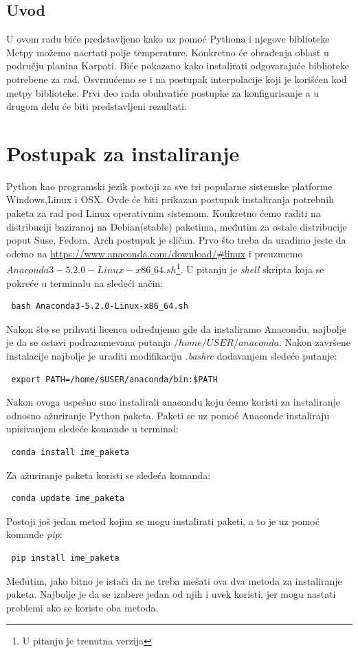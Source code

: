 \documentclass[12pt]{article}
\begin{document}
\newpage
\begin{center}
\section*{Uvod}
U ovom radu biće predstavljeno kako uz pomoć Pythona i njegove biblioteke Metpy možemo nacrtati polje temperature. Konkretno će obrađenja oblast u području planina Karpati. Biće pokazano kako instalirati odgovarajuće biblioteke potrebene za rad. Osvrnućemo se i na postupak interpolacije koji je korišćen kod metpy biblioteke. Prvi deo rada obuhvatiće postupke za konfigurisanje a u drugom delu će biti predstavljeni rezultati. 
\end{center}
\newpage
\section{Postupak za instaliranje}
Python kao programski jezik postoji za sve tri popularne sistemske platforme Windows,Linux i OSX. Ovde će biti prikazan postupak instaliranja potrebnih paketa za rad pod Linux operativnim sistemom. Konkretno ćemo raditi na distribuciji baziranoj na Debian(stable) paketima, međutim za ostale distribucije poput Suse, Fedora, Arch postupak je sličan.
Prvo što treba da uradimo jeste da odemo na \url{https://www.anaconda.com/download/#linux} i preuzmemo $Anaconda3-5.2.0-Linux-x86{\_64}.sh$\footnote{U pitanju je trenutna verzija}. U pitanju je \textsl{shell} skripta koja se pokreće u terminalu na sledeći način: 
\begin{lstlisting}
 bash Anaconda3-5.2.0-Linux-x86_64.sh
\end{lstlisting}
Nakon što se prihvati licenca određujemo gde da instaliramo Anacondu, najbolje je da se ostavi podrazumevana putanja $/home/USER/anaconda$. Nakon završene instalacije najbolje je uraditi modifikaciju \textsl{.bashrc} dodavanjem sledeće putanje:
\begin{lstlisting}
 export PATH=/home/$USER/anaconda/bin:$PATH
\end{lstlisting}
Nakon ovoga uspešno smo instalirali anacondu koju ćemo koristi za instaliranje odnosno ažuriranje Python paketa. Paketi se uz pomoć Anaconde instaliraju upisivanjem sledeće komande u terminal:
\begin{lstlisting}
 conda install ime_paketa 
\end{lstlisting}
Za ažuriranje paketa koristi se sledeća komanda:
\begin{lstlisting}
 conda update ime_paketa 
\end{lstlisting}
Postoji još jedan metod kojim se mogu instalirati paketi, a to je uz pomoć komande \textsl{pip}:
\begin{lstlisting}
 pip install ime_paketa 
\end{lstlisting}
Međutim, jako bitno je istaći da ne treba mešati ova dva metoda za instaliranje paketa. Najbolje je da se izabere jedan od njih i uvek koristi, jer mogu nastati problemi ako se koriste oba metoda. 
\end{document}
